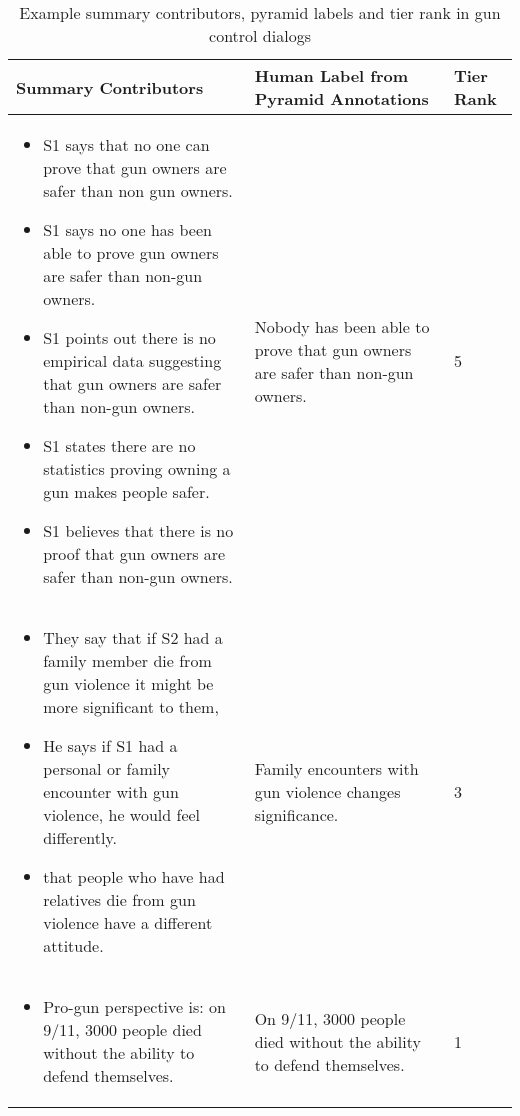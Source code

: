\documentclass[11pt]{article}
\begin{document}
\begin{table*}[t!h]
\begin{center}
\begin{small}
\begin{tabular} { |p{10cm} | >{\centering}p{3cm}  |p{.6cm}|}  \hline
\bf Summary Contributors& \bf  {Human Label from Pyramid Annotations} & \bf {Tier Rank}  \\ \hline
 \begin{itemize}[noitemsep,topsep=0pt,parsep=0pt,partopsep=0pt,leftmargin=*]
 \item  S1 says that no one can prove that gun owners are safer than non gun owners.
 \item S1 says no one has been able to prove gun owners are safer than non-gun owners.
  \item S1 points out there is no empirical data suggesting that gun owners are safer than non-gun owners.
  \item S1 states there are no statistics proving owning a gun makes people safer.
 \item  S1 believes that there is no proof that gun owners are safer than non-gun owners.
   \end{itemize}
   & Nobody has been able to prove that gun owners are safer than non-gun owners. &5 \\ \hline
    \begin{itemize}[noitemsep,topsep=0pt,parsep=0pt,partopsep=0pt,leftmargin=*]
 \item They say that if S2 had a family member die from gun violence it might be more significant to them,
 \item  He says if S1 had a personal or family encounter with gun violence, he would feel differently.
 \item  that people who have had relatives die from gun violence have a different attitude.
 \end{itemize} &Family encounters with gun violence changes significance.&3 \\ \hline
 \begin{itemize}[noitemsep,topsep=0pt,parsep=0pt,partopsep=0pt,leftmargin=*]
\item Pro-gun perspective is: on 9/11, 3000 people died without the ability to defend themselves. \end{itemize}& On 9/11, 3000 people died without the ability to defend themselves. &1 \\ \hline

\end{tabular}
\vspace{-.1in}
\end{small}
\caption{\label{contrib-label} Example summary contributors, pyramid labels and tier rank in gun control dialogs}
\end{center}
\vspace{-.2in}
\end{table*}
\end{document}
